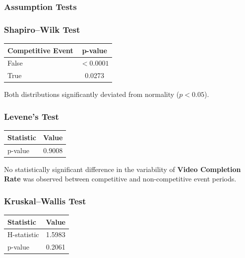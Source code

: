 \subsubsection{Assumption Tests}

\subsubsection{Shapiro--Wilk Test}

\begin{table}[H]
	\centering
	\begin{tabular}{lc}
		\toprule
		Competitive Event & p-value \\
		\midrule
		False & $<0.0001$ \\
		True & 0.0273 \\
		\bottomrule
	\end{tabular}
\end{table}

Both distributions significantly deviated from normality ($p<0.05$).

\vspace{0.3cm}

\subsubsection{Levene's Test}

\begin{table}[H]
	\centering
	\begin{tabular}{lc}
		\toprule
		Statistic & Value \\
		\midrule
		p-value & 0.9008 \\
		\bottomrule
	\end{tabular}
\end{table}

No statistically significant difference in the variability of \textbf{Video Completion Rate} was observed between competitive and non-competitive event periods.

\vspace{0.3cm}

\subsubsection{Kruskal--Wallis Test}

\begin{table}[H]
	\centering
	\begin{tabular}{lc}
		\toprule
		Statistic & Value \\
		\midrule
		H-statistic & 1.5983 \\
		p-value & 0.2061 \\
		\bottomrule
	\end{tabular}
\end{table}

